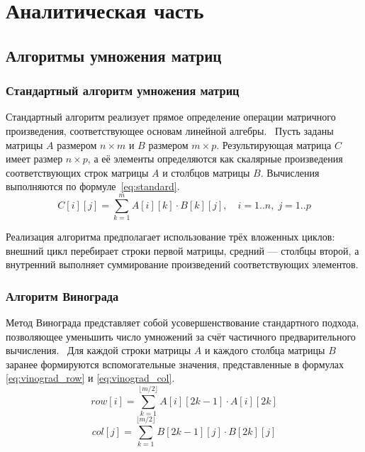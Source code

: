 \chapter{Аналитическая часть}

\section{Алгоритмы умножения матриц}

\subsection{Стандартный алгоритм умножения матриц}

Стандартный алгоритм реализует прямое определение операции матричного произведения, соответствующее основам линейной алгебры.~\cite{lit1} Пусть заданы матрицы $A$ размером $n \times m$ и $B$ размером $m \times p$. Результирующая матрица $C$ имеет размер $n \times p$, а её элементы определяются как скалярные произведения соответствующих строк матрицы $A$ и столбцов матрицы $B$. Вычисления выполняются по формуле~\eqref{eq:standard}.
\begin{equation} \label{eq:standard}
	C[i][j] = \sum_{k=1}^{m} A[i][k] \cdot B[k][j], \quad i = 1..n, \; j = 1..p
\end{equation}

Реализация алгоритма предполагает использование трёх вложенных циклов: внешний цикл перебирает строки первой матрицы, средний — столбцы второй, а внутренний выполняет суммирование произведений соответствующих элементов.

\subsection{Алгоритм Винограда}

Метод Винограда представляет собой усовершенствование стандартного подхода, позволяющее уменьшить число умножений за счёт частичного предварительного вычисления.~\cite{lit2} Для каждой строки матрицы $A$ и каждого столбца матрицы $B$ заранее формируются вспомогательные значения, представленные в формулах \eqref{eq:vinograd_row} и \eqref{eq:vinograd_col}.
\begin{equation} \label{eq:vinograd_row}
	row[i] = \sum_{k=1}^{\lfloor m/2 \rfloor} A[i][2k-1] \cdot A[i][2k]
\end{equation}
\begin{equation} \label{eq:vinograd_col}
	col[j] = \sum_{k=1}^{\lfloor m/2 \rfloor} B[2k-1][j] \cdot B[2k][j]
\end{equation}

